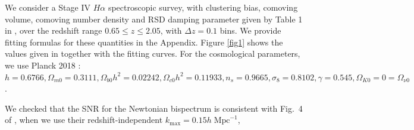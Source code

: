 We consider a Stage IV $H \alpha$ spectroscopic survey, with clustering bias, comoving volume, comoving  number density and RSD damping parameter given by Table 1 in \cite{Yankelevich:2018uaz}, over the redshift range {$0.65\leq z\leq 2.05$}, with  $\Delta z=0.1$ bins. 
We provide fitting formulas for these quantities in the Appendix.
Figure \ref{fig1} shows the values given in \cite{Yankelevich:2018uaz} together with the fitting curves. For the  cosmological parameters, we use Planck 2018  \cite{Aghanim:2018eyx}:
$h = 0.6766, \Omega_{m0} = 0.3111,
 \Omega_{b0}h^{2}= 0.02242,
\Omega_{c0} h^{2} = 0.11933,
n_s = 0.9665,
\sigma_8 = 0.8102, \gamma=0.545,
\Omega_{K0} = 0= \Omega_{\nu 0}$.

We checked that the SNR for the Newtonian bispectrum is consistent with Fig.~4 of \cite{Yankelevich:2018uaz}, when we use their redshift-independent $k_{\mathrm{max}} = 0.15h\;\mathrm{Mpc}^{-1}$, 
%
